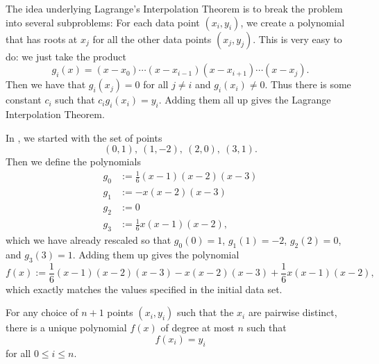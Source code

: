 The idea underlying Lagrange's Interpolation Theorem is to break the problem into several subproblems: For each data point $(x_i,y_i)$, we create a polynomial that has roots at $x_j$ for all the other data points $(x_j,y_j)$. This is very easy to do: we just take the product
\begin{equation*}
  g_i(x)=(x-x_0)\cdots (x-x_{i-1})(x-x_{i+1})\cdots (x-x_j).
\end{equation*}
Then we have that $g_i(x_j)=0$ for all $j\neq i$ and $g_i(x_i)\neq 0$. Thus there is some constant $c_i$ such that $c_ig_i(x_i)=y_i$. Adding them all up gives the Lagrange Interpolation Theorem.

\begin{example}
  In , we started with the set of points
  \begin{equation*}
    (0,1),\ (1,-2),\ (2,0),\ (3,1).
  \end{equation*}
  Then we define the polynomials
  \begin{align*}
    g_0 & := {\textstyle \frac{1}{6}}(x-1)(x-2)(x-3) \\
    g_1 & := -x(x-2)(x-3) \\
    g_2 & := 0 \\
    g_3 & := {\textstyle \frac{1}{6}}x(x-1)(x-2),
  \end{align*}
  which we have already rescaled so that $g_0(0)=1$, $g_1(1)=-2$, $g_2(2)=0$, and $g_3(3)=1$. Adding them up gives the polynomial
  \begin{equation*}
    f(x) := \frac{1}{6}(x-1)(x-2)(x-3) - x(x-2)(x-3) + \frac{1}{6}x(x-1)(x-2),
  \end{equation*}
  which exactly matches the values specified in the initial data set.
\end{example}

\begin{theorem}\label{theorem:lagranges-interpolation-theorem}
  For any choice of $n+1$ points $(x_i,y_i)$ such that the $x_i$ are pairwise distinct, there is a unique polynomial $f(x)$ of degree at most $n$ such that
  \begin{equation*}
    f(x_i)=y_i
  \end{equation*}
  for all $0\leq i\leq n$.
\end{theorem}

